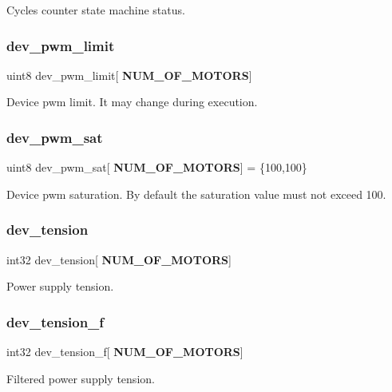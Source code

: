 Cycles counter state machine status. \mbox{\label{globals_8c_ac7fdc35fc8e87ead9b45028d6034fb1b}} 
\subsubsection{dev\+\_\+pwm\+\_\+limit}
{\footnotesize\ttfamily uint8 dev\+\_\+pwm\+\_\+limit[\textbf{ N\+U\+M\+\_\+\+O\+F\+\_\+\+M\+O\+T\+O\+RS}]}

Device pwm limit. It may change during execution. \mbox{\label{globals_8c_a2e254e60f92958e2fdec99dde626dca6}} 
\subsubsection{dev\+\_\+pwm\+\_\+sat}
{\footnotesize\ttfamily uint8 dev\+\_\+pwm\+\_\+sat[\textbf{ N\+U\+M\+\_\+\+O\+F\+\_\+\+M\+O\+T\+O\+RS}] = \{100,100\}}

Device pwm saturation. By default the saturation value must not exceed 100. \mbox{\label{globals_8c_aada869b6650bdd87ca481109ae08231c}} 
\subsubsection{dev\+\_\+tension}
{\footnotesize\ttfamily int32 dev\+\_\+tension[\textbf{ N\+U\+M\+\_\+\+O\+F\+\_\+\+M\+O\+T\+O\+RS}]}

Power supply tension. \mbox{\label{globals_8c_aa2494c7cd8f096ca7f2ead0a1430a597}} 
\subsubsection{dev\+\_\+tension\+\_\+f}
{\footnotesize\ttfamily int32 dev\+\_\+tension\+\_\+f[\textbf{ N\+U\+M\+\_\+\+O\+F\+\_\+\+M\+O\+T\+O\+RS}]}

Filtered power supply tension. \mbox{\label{globals_8c_af909e8281823c106dd4191858f995b32}} 
